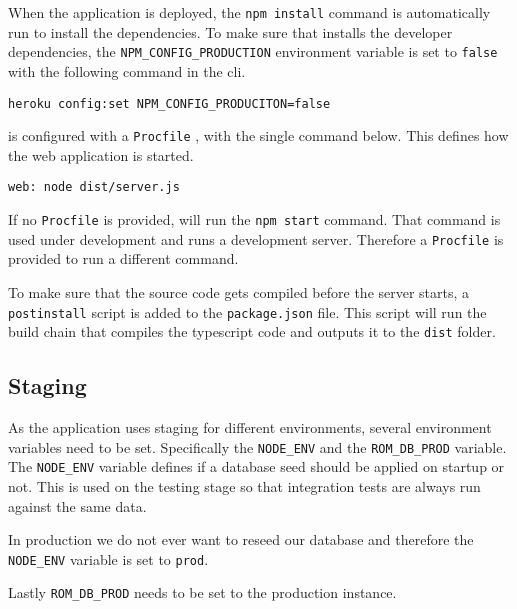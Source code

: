 When the application is deployed, the \verb+npm install+ command is automatically run to install the dependencies.
To make sure that  installs the developer dependencies, the \verb+NPM_CONFIG_PRODUCTION+ environment variable is set to \verb+false+ with the following command in the  \gls{cli}.

\verb+heroku config:set NPM_CONFIG_PRODUCITON=false+

 is configured with a \verb+Procfile+ \citep{documentation:deployment:heroku:procfile}, with the single command below. This defines how the web application is started.

\verb+web: node dist/server.js+

If no \verb+Procfile+ is provided,  will run the \verb+npm start+ command.
That command is used under development and runs a development server.
Therefore a \verb+Procfile+ is provided to run a different command.

To make sure that the source code gets compiled before the server starts, a \verb+postinstall+ script is added to the \verb+package.json+ file.
This script will run the  build chain that compiles the \gls{typescript} code and outputs it to the \verb+dist+ folder.

\subsection{Staging}
\label{sec:staging}
As the application uses staging for different environments, several environment variables need to be set.
Specifically the \verb+NODE_ENV+ and the \verb+ROM_DB_PROD+ variable. 
The \verb+NODE_ENV+ variable defines if a database seed should be applied on startup or not. 
This is used on the testing stage so that integration tests are always run against the same data.

In production we do not ever want to reseed our database and therefore the \verb+NODE_ENV+ variable is set to \verb+prod+.

Lastly \verb+ROM_DB_PROD+ needs to be set to the production  instance.
